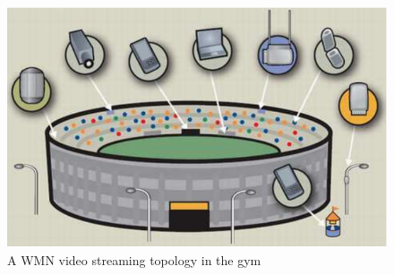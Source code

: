 \begin{figure}
\begin{center}
\includegraphics[width=0.8\columnwidth ,angle=0]{gym}
\caption{A WMN video streaming topology in the gym}
\label{gym}
\end{center}
\end{figure}
